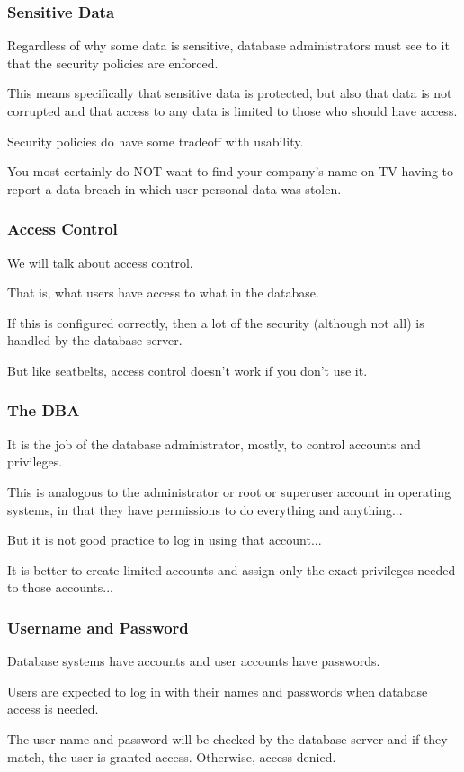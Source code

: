 \begin{frame}
\frametitle{Sensitive Data}

Regardless of why some data is sensitive, database administrators must see to it that the security policies are enforced. 

This means specifically that sensitive data is protected, but also that data is not corrupted and that access to any data is limited to those who should have access. 

Security policies do have some tradeoff with usability.

You most certainly do NOT want to find your company's name on TV having to report a data breach in which user personal data was stolen.

\end{frame}



\begin{frame}
\frametitle{Access Control}

We will talk about access control. 

That is, what users have access to what in the database. 

If this is configured correctly, then a lot of the security (although not all) is handled by the database server. 

But like seatbelts, access control doesn't work if you don't use it.

\end{frame}



\begin{frame}
\frametitle{The DBA}

It is the job of the database administrator, mostly, to control accounts and privileges. 

This is analogous to the administrator or root or superuser account in operating systems, in that they have permissions to do everything and anything... 

But it is not good practice to log in using that account... 

It is better to create limited accounts and assign only the exact privileges needed to those accounts...

\end{frame}



\begin{frame}
\frametitle{Username and Password}

Database systems have accounts and user accounts have passwords. 

Users are expected to log in with their names and passwords when database access is needed. 

The user name and password will be checked by the database server and if they match, the user is granted access. Otherwise, access denied.


\end{frame}


